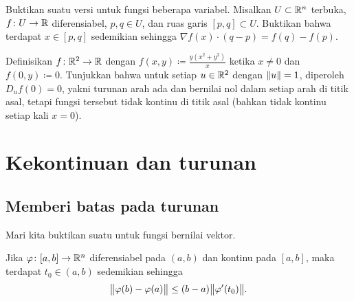 \begin{exercise}
Buktikan suatu versi \emph{}
untuk fungsi beberapa variabel.  Misalkan $U \subset {\mathbb{R}}^n$
terbuka, $f \colon U \to {\mathbb{R}}$ diferensiabel, $p,q \in U$, dan ruas garis
$[p,q] \subset U$.  Buktikan bahwa terdapat $x \in [p,q]$ sedemikian sehingga
$\nabla f (x) \cdot (q-p) = f(q)-f(p)$.
\end{exercise}

\begin{exercise}
Definisikan $f \colon {\mathbb{R}}^2 \to {\mathbb{R}}$ dengan $f(x,y) \coloneqq \frac{y(x^2+y^2)}{x}$
ketika $x \neq 0$ dan $f(0,y) \coloneqq 0$.  Tunjukkan bahwa untuk setiap $u \in {\mathbb{R}}^2$
dengan $\lVert {u} \rVert=1$, diperoleh $D_u f(0) = 0$, yakni turunan
arah ada dan bernilai nol dalam setiap arah di titik asal, tetapi
fungsi tersebut tidak kontinu di titik asal (bahkan tidak kontinu setiap kali
$x=0$).
\end{exercise}


\sectionnewpage
\section{Kekontinuan dan turunan}
\label{sec:svthedercont}



\subsection{Memberi batas pada turunan}

Mari kita buktikan suatu  untuk fungsi bernilai vektor.

\begin{lemma} \label{lemma:mvtmv}
Jika $\varphi \colon [a,b] \to {\mathbb{R}}^n$ diferensiabel pada $(a,b)$ dan
kontinu pada $[a,b]$, maka terdapat $t_0 \in (a,b)$ sedemikian sehingga
\begin{equation*}
\bigl\lVert {\varphi(b)-\varphi(a)} \bigr\rVert \leq (b-a) \bigl\lVert {\varphi'(t_0)} \bigr\rVert .
\end{equation*}
\end{lemma}

